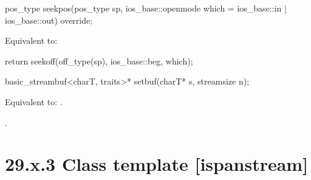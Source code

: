 \documentclass[ebook,11pt,article]{memoir}
\begin{document}
\begin{itemdecl}
pos_type seekpos(pos_type sp,
                 ios_base::openmode which
                   = ios_base::in | ios_base::out) override;
\end{itemdecl}

\begin{itemdescr}
\pnum
\effects
Equivalent to: 
\begin{codeblock}
return seekoff(off_type(sp), ios_base::beg, which);
\end{codeblock}
\end{itemdescr}

\begin{itemdecl}
basic_streambuf<charT, traits>* setbuf(charT* s, streamsize n);
\end{itemdecl}

\begin{itemdescr}
\pnum
\effects
Equivalent to:
.

\pnum
\returns
{}.
\end{itemdescr} 

\section{29.x.3 Class template  [ispanstream] }
\end{document}

